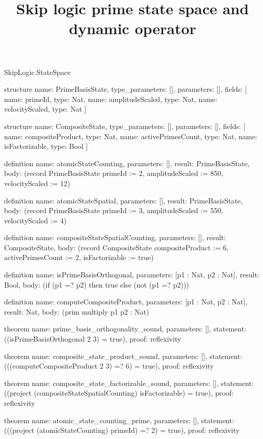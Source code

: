 \begin{lexlean}{SkipLogic.StateSpace}
\title{Skip logic prime state space and dynamic operator}
\begin{semanticmodule}
structure{
  name: PrimeBasisState,
  type_parameters: [],
  parameters: [],
  fields: [
    {name: primeId, type: Nat},
    {name: amplitudeScaled, type: Nat},
    {name: velocityScaled, type: Nat}
  ]
}

structure{
  name: CompositeState,
  type_parameters: [],
  parameters: [],
  fields: [
    {name: compositeProduct, type: Nat},
    {name: activePrimesCount, type: Nat},
    {name: isFactorizable, type: Bool}
  ]
}

definition{
  name: atomicStateCounting,
  parameters: [],
  result: PrimeBasisState,
  body: (record PrimeBasisState {primeId := 2, amplitudeScaled := 850, velocityScaled := 12})
}

definition{
  name: atomicStateSpatial,
  parameters: [],
  result: PrimeBasisState,
  body: (record PrimeBasisState {primeId := 3, amplitudeScaled := 550, velocityScaled := 4})
}

definition{
  name: compositeStateSpatialCounting,
  parameters: [],
  result: CompositeState,
  body: (record CompositeState {compositeProduct := 6, activePrimesCount := 2, isFactorizable := true})
}

definition{
  name: isPrimeBasisOrthogonal,
  parameters: [p1 : Nat, p2 : Nat],
  result: Bool,
  body: (if (p1 =? p2) then true else (not (p1 =? p2)))
}

definition{
  name: computeCompositeProduct,
  parameters: [p1 : Nat, p2 : Nat],
  result: Nat,
  body: (prim multiply p1 p2 : Nat)
}

theorem{
  name: prime_basis_orthogonality_sound,
  parameters: [],
  statement: ((isPrimeBasisOrthogonal 2 3) = true),
  proof: reflexivity{}
}

theorem{
  name: composite_state_product_sound,
  parameters: [],
  statement: (((computeCompositeProduct 2 3) =? 6) = true),
  proof: reflexivity{}
}

theorem{
  name: composite_state_factorizable_sound,
  parameters: [],
  statement: ((project (compositeStateSpatialCounting) isFactorizable) = true),
  proof: reflexivity{}
}

theorem{
  name: atomic_state_counting_prime,
  parameters: [],
  statement: (((project (atomicStateCounting) primeId) =? 2) = true),
  proof: reflexivity{}
}
\end{semanticmodule}
\end{lexlean}

